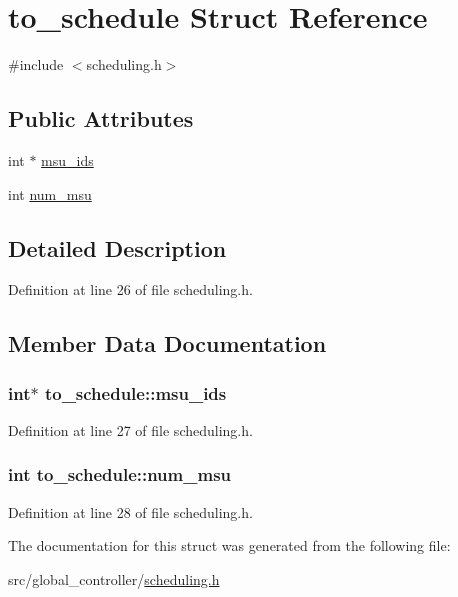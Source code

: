 \hypertarget{structto__schedule}{\section{to\-\_\-schedule Struct Reference}
\label{structto__schedule}
}


{\ttfamily \#include $<$scheduling.\-h$>$}

\subsection*{Public Attributes}
\begin{DoxyCompactItemize}
\item 
int $\ast$ \hyperlink{structto__schedule_af8cd489cdde3677d4953c28d33ab039b}{msu\-\_\-ids}
\item 
int \hyperlink{structto__schedule_a701fee5eb3dee07d7ea2f1a7868e099c}{num\-\_\-msu}
\end{DoxyCompactItemize}


\subsection{Detailed Description}


Definition at line 26 of file scheduling.\-h.



\subsection{Member Data Documentation}
\hypertarget{structto__schedule_af8cd489cdde3677d4953c28d33ab039b}{
\subsubsection[{msu\-\_\-ids}]{\setlength{\rightskip}{0pt plus 5cm}int$\ast$ to\-\_\-schedule\-::msu\-\_\-ids}}\label{structto__schedule_af8cd489cdde3677d4953c28d33ab039b}


Definition at line 27 of file scheduling.\-h.

\hypertarget{structto__schedule_a701fee5eb3dee07d7ea2f1a7868e099c}{
\subsubsection[{num\-\_\-msu}]{\setlength{\rightskip}{0pt plus 5cm}int to\-\_\-schedule\-::num\-\_\-msu}}\label{structto__schedule_a701fee5eb3dee07d7ea2f1a7868e099c}


Definition at line 28 of file scheduling.\-h.



The documentation for this struct was generated from the following file\-:\begin{DoxyCompactItemize}
\item 
src/global\-\_\-controller/\hyperlink{scheduling_8h}{scheduling.\-h}\end{DoxyCompactItemize}
